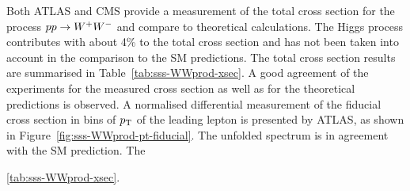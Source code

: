 
Both ATLAS and CMS provide a measurement of the total cross section for the process $pp \rightarrow W^+W^-$
and compare to theoretical calculations. The Higgs process contributes with about 4\% to the total 
cross section and has not been taken into account in the comparison to the SM predictions.
The total cross section results are summarised in Table~\ref{tab:sss-WWprod-xsec}.
A good agreement of the experiments for the measured cross section as well as for the theoretical predictions
is observed.
A normalised differential measurement of the fiducial cross section in bins of $p_{\mathrm{T}}$ of the leading lepton is presented by ATLAS,
as shown in Figure~\ref{fig:sss-WWprod-pt-fiducial}. The unfolded spectrum is in agreement with the SM prediction. The 


\ref{tab:sss-WWprod-xsec}.
\begin{table}[htp]
\begin{center}
\caption{Summary of measured fiducial and total $\WW$ production cross sections from ATLAS and CMS 
at 7 and 8 TeV centre-of-mass energies in the $\lnu\lnu$ final state.}
\end{center}
\label{tab:sss-WWprod-xsec}
\end{table}%


